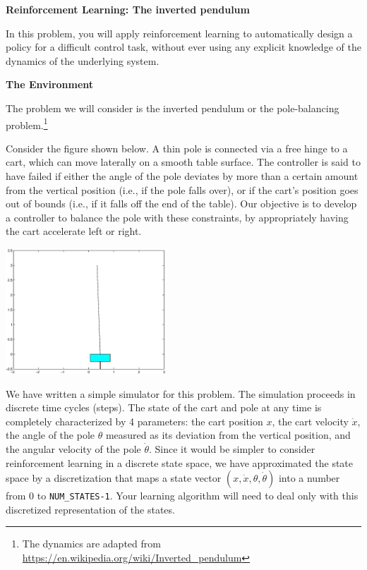 \item {} {\bf Reinforcement Learning: The inverted pendulum}

In this problem, you will apply reinforcement learning to automatically
design a policy for a difficult control task, without ever using any 
explicit knowledge of the dynamics of the underlying system.

\textbf{The Environment}

The problem we will consider is the inverted pendulum or the pole-balancing 
problem.\footnote{The dynamics are adapted from
\url{https://en.wikipedia.org/wiki/Inverted_pendulum}}

Consider the figure shown below. A thin pole is connected via a free hinge to a cart, 
which can move laterally on a smooth table surface. The controller is said to 
have failed if either the angle of the pole deviates by more than a certain
amount from the vertical position (i.e., if the pole falls over), or if the
cart's position goes out of bounds (i.e., if it falls off the end of the table).
Our objective is to develop a controller to balance the pole with these 
constraints, by appropriately having the cart accelerate left or right.


\begin{center}
  \includegraphics[width=6cm]{cartpole/cart_pole.eps}
\end{center}

We have written a simple simulator for this problem. The simulation 
proceeds in discrete time cycles (steps). The state of the cart and pole at any time 
is completely characterized by 4 parameters: the cart position $x$, the 
cart velocity $\dot{x}$, the angle of the pole $\theta$ measured as its deviation 
from the vertical position, and the angular velocity of the pole $\dot{\theta}$.  
Since it would be simpler to
consider reinforcement learning in a discrete state space,
we have approximated the state space by a discretization that maps 
a state vector $(x,\dot{x}, \theta, \dot{\theta})$ into a number
from 0 to {\tt NUM\_STATES-1}. Your learning algorithm will need to 
deal only with this discretized representation of the states.

